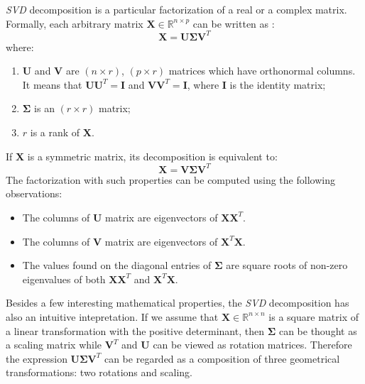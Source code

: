 \begin{appendices}
\textit{SVD} decomposition is a particular factorization of a real or a complex matrix. Formally, each arbitrary matrix $\boldsymbol{X} \in \mathbb{R}^{n \times p}$ can be written as \cite{Jolliffe}:
\begin{equation}
    \boldsymbol{X}=\boldsymbol{U}\boldsymbol{\Sigma}{\boldsymbol{V}^T}
\end{equation}
where:
\begin{enumerate}
    \item $\boldsymbol{U}$ and $\boldsymbol{V}$ are $(n \times r)$, $(p \times r)$ matrices which have orthonormal columns. It means that $\boldsymbol{U}\boldsymbol{U}^T=\boldsymbol{I}$ and $\boldsymbol{V}\boldsymbol{V}^T=\boldsymbol{I}$, where $\boldsymbol{I}$ is the identity matrix;
    \item $\boldsymbol{\Sigma}$ is an $(r \times r)$ matrix;
    \item $r$ is a rank of $\boldsymbol{X}$.
\end{enumerate}
If $\boldsymbol{X}$ is a symmetric matrix, its decomposition is equivalent to:
\begin{equation}
    \boldsymbol{X}=\boldsymbol{V}\boldsymbol{\Sigma}{\boldsymbol{V}^T}
\end{equation}
The factorization with such properties can be computed using the following observations:
\begin{itemize}
    \item The columns of $\boldsymbol{U}$ matrix are eigenvectors of $\boldsymbol{X}\boldsymbol{X}^T$.
    \item The columns of $\boldsymbol{V}$ matrix are eigenvectors of $\boldsymbol{X}^T\boldsymbol{X}$.
    \item The values found on the diagonal entries of $\boldsymbol{\Sigma}$ are square roots of non-zero eigenvalues of both $\boldsymbol{X}\boldsymbol{X}^T$ and $\boldsymbol{X}^T\boldsymbol{X}$.
\end{itemize}

Besides a few interesting mathematical properties, the \textit{SVD} decomposition has also an intuitive intepretation. If we assume that $\boldsymbol{X} \in \mathbb{R}^{n \times n}$ is a square matrix of a linear transformation with the positive determinant, then $\boldsymbol{\Sigma}$ can be thought as a scaling matrix while $\boldsymbol{V}^T$ and $\boldsymbol{U}$ can be viewed as rotation matrices. Therefore the expression $\boldsymbol{U}\boldsymbol{\Sigma}{\boldsymbol{V}^T}$ can be regarded as a composition of three geometrical transformations: two rotations and scaling\cite{SVD}.


\end{appendices}
